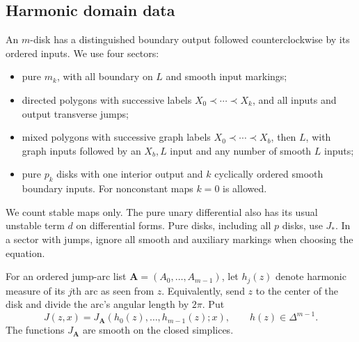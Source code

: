 \documentclass[11pt]{article}
\theoremstyle{definition}
\theoremstyle{remark}
\numberwithin{equation}{section}
\begin{document}
\subsection{Harmonic domain data}

An $m$-disk has a distinguished boundary output followed
counterclockwise by its ordered inputs.  We use four sectors:
\begin{itemize}
\item pure $m_k$, with all boundary on $L$ and smooth input markings;
\item directed polygons with successive labels
$X_0\prec\cdots\prec X_k$, and all inputs and output transverse jumps;
\item mixed polygons with successive graph labels
$X_0\prec\cdots\prec X_b$, then $L$, with graph inputs followed by an
$X_b,L$ input and any number of smooth $L$ inputs;
\item pure $p_k$ disks with one interior output and $k$ cyclically
ordered smooth boundary inputs.  For nonconstant maps $k=0$ is allowed.
\end{itemize}
We count stable maps only.  The pure unary differential also has its
usual unstable term $d$ on differential forms.  Pure disks, including
all $p$ disks, use $J_*$.  In a sector with jumps, ignore all smooth and
auxiliary markings when choosing the equation.

For an ordered jump-arc list $\mathbf A=(A_0,\ldots,A_{m-1})$, let
$h_j(z)$ denote harmonic measure of its $j$th arc as seen from $z$.
Equivalently, send $z$ to the center of the disk and divide the arc's
angular length by $2\pi$.  Put
\begin{equation}\label{local:harmonic-J}
 J(z,x)=J_{\mathbf A}(h_0(z),\ldots,h_{m-1}(z);x),
 \qquad h(z)\in\Delta^{m-1}.
\end{equation}
The functions $J_{\mathbf A}$ are smooth on the closed simplices.
\end{document}
